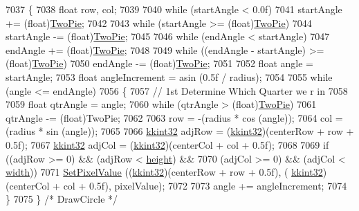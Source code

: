 \begin{DoxyCode}
7037 \{
7038   \textcolor{keywordtype}{float}  row, col;
7039 
7040   \textcolor{keywordflow}{while}  (startAngle < 0.0f)
7041     startAngle += (float)\hyperlink{_k_k_base_types_8h_a964d907aa0bbca73f950ed1659081d73}{TwoPie};
7042 
7043   \textcolor{keywordflow}{while}  (startAngle >= (\textcolor{keywordtype}{float})\hyperlink{_k_k_base_types_8h_a964d907aa0bbca73f950ed1659081d73}{TwoPie})
7044     startAngle -= (\textcolor{keywordtype}{float})\hyperlink{_k_k_base_types_8h_a964d907aa0bbca73f950ed1659081d73}{TwoPie};
7045 
7046   \textcolor{keywordflow}{while}  (endAngle < startAngle)
7047     endAngle += (float)\hyperlink{_k_k_base_types_8h_a964d907aa0bbca73f950ed1659081d73}{TwoPie};
7048   
7049   \textcolor{keywordflow}{while}  ((endAngle - startAngle) >= (float)\hyperlink{_k_k_base_types_8h_a964d907aa0bbca73f950ed1659081d73}{TwoPie})
7050     endAngle -= (float)\hyperlink{_k_k_base_types_8h_a964d907aa0bbca73f950ed1659081d73}{TwoPie};
7051 
7052   \textcolor{keywordtype}{float}  angle = startAngle;
7053   \textcolor{keywordtype}{float}  angleIncrement = asin (0.5f / radius);
7054 
7055   \textcolor{keywordflow}{while}  (angle <= endAngle)
7056   \{
7057     \textcolor{comment}{// 1st Determine Which Quarter we r in}
7058 
7059     \textcolor{keywordtype}{float}  qtrAngle = angle;
7060     \textcolor{keywordflow}{while}  (qtrAngle > (\textcolor{keywordtype}{float})\hyperlink{_k_k_base_types_8h_a964d907aa0bbca73f950ed1659081d73}{TwoPie})
7061       qtrAngle -= (float)TwoPie;
7062 
7063     row = -(radius * cos (angle));
7064     col =  (radius * sin (angle));
7065 
7066     \hyperlink{namespace_k_k_b_a8fa4952cc84fda1de4bec1fbdd8d5b1b}{kkint32}  adjRow = (\hyperlink{namespace_k_k_b_a8fa4952cc84fda1de4bec1fbdd8d5b1b}{kkint32})(centerRow + row + 0.5f);
7067     \hyperlink{namespace_k_k_b_a8fa4952cc84fda1de4bec1fbdd8d5b1b}{kkint32}  adjCol = (\hyperlink{namespace_k_k_b_a8fa4952cc84fda1de4bec1fbdd8d5b1b}{kkint32})(centerCol + col + 0.5f);
7068 
7069     \textcolor{keywordflow}{if}  ((adjRow >= 0)  &&  (adjRow < \hyperlink{class_k_k_b_1_1_raster_af39ff189de4fbb6de98392e187efafb7}{height})  &&
7070          (adjCol >= 0)  &&  (adjCol < \hyperlink{class_k_k_b_1_1_raster_ae0bcc103e191c3421d7692dc69ceb554}{width}))
7071       \hyperlink{class_k_k_b_1_1_raster_a5ddb8bd069dc64241941b0b011af8667}{SetPixelValue} ((\hyperlink{namespace_k_k_b_a8fa4952cc84fda1de4bec1fbdd8d5b1b}{kkint32})(centerRow + row + 0.5f), (
      \hyperlink{namespace_k_k_b_a8fa4952cc84fda1de4bec1fbdd8d5b1b}{kkint32})(centerCol + col + 0.5f), pixelValue);
7072 
7073     angle += angleIncrement;
7074   \}
7075 \}  \textcolor{comment}{/* DrawCircle */}
\end{DoxyCode}
